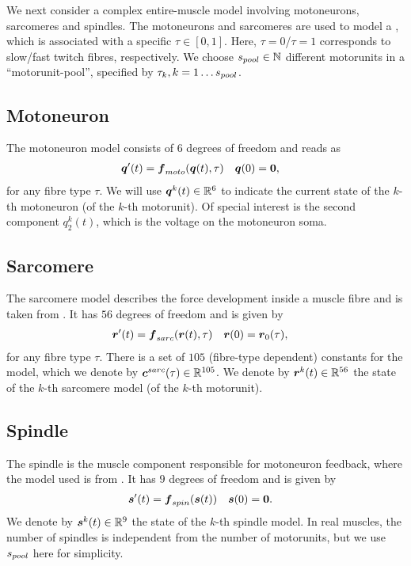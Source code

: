 We next consider a complex entire-muscle model involving motoneurons, sarcomeres and spindles.
The motoneurons and sarcomeres are used to model a , which is associated with a specific  $\tau\in[0,1]$.
Here, $\tau=0$/$\tau=1$ corresponds to slow/fast twitch fibres, respectively.
We choose ${s_{pool}}\in \mathbb{N}$ different motorunits in a ``motorunit-pool'', specified by $\tau_k,k=1\ldots{s_{pool}}$.

\subsection{Motoneuron}
The motoneuron model consists of $6$ degrees of freedom and reads as
\begin{align}
	\boldsymbol{q}'(t) &= \boldsymbol{f}_{moto}(\boldsymbol{q}(t),\tau) & \boldsymbol{q}(0) &= \boldsymbol{0},
\end{align}
for any fibre type $\tau$.
We will use $\boldsymbol{q}^k(t) \in \mathbb{R}^6$ to indicate the current state of the $k$-th motoneuron (of the $k$-th motorunit).
Of special interest is the second component $q^k_2(t)$, which is the voltage on the motoneuron soma.


\subsection{Sarcomere}
The sarcomere model describes the force development inside a muscle fibre and is taken from \cite{Shorten2007}.
It has $56$ degrees of freedom and is given by
\begin{align}
	\boldsymbol{r}'(t) &= \boldsymbol{f}_{sarc}(\boldsymbol{r}(t),\tau) & \boldsymbol{r}(0) &= \boldsymbol{r}_0(\tau),
\end{align}
for any fibre type $\tau$.
There is a set of $105$ (fibre-type dependent) constants for the model, which we denote by $\boldsymbol{c}^{sarc}(\tau)\in\mathbb{R}^{105}$.
We denote by $\boldsymbol{r}^k(t)\in\mathbb{R}^{56}$ the state of the $k$-th sarcomere model (of the $k$-th motorunit).

\subsection{Spindle}
The spindle is the muscle component responsible for motoneuron feedback, where the model used is from \cite{Mileusnic2006}.
It has $9$ degrees of freedom and is given by
\begin{align}
	\boldsymbol{s}'(t) &= \boldsymbol{f}_{spin}(\boldsymbol{s}(t)) & \boldsymbol{s}(0) &= \boldsymbol{0}.
\end{align}
We denote by $\boldsymbol{s}^k(t)\in\mathbb{R}^9$ the state of the $k$-th spindle model. In real muscles, the number of spindles is independent from the
number of motorunits, but we use ${s_{pool}}$ here for simplicity.

